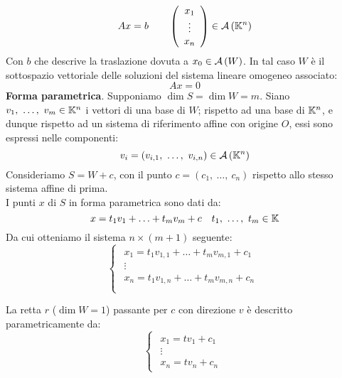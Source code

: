 	\begin{equation}
		Ax=b\qquad\left(\begin{array}{c}
			x_1\\
			\vdots\\
			x_n
		\end{array}\right)\in{\ensuremath{\mathcal{A}\left(\mathbb{K}^{n}\right)}}
	\end{equation}
Con $b$ che descrive la traslazione dovuta a $x_0\in{\ensuremath{\mathcal{A}\left(W\right)}}$.
In tal caso $W$ è il sottospazio vettoriale delle soluzioni del sistema lineare omogeneo associato:
\begin{equation}
	Ax=0
\end{equation}
\textbf{Forma parametrica}. Supponiamo $\dim S=\dim W=m$. Siano $v_1,\ \ldots,\ v_m\in\mathbb{K}^n$ i vettori di una base di $W$; rispetto ad una base di $\mathbb{K}^n$, e dunque rispetto ad un sistema di riferimento affine con origine $O$, essi sono espressi nelle componenti:
\begin{equation*}
	v_i=\left(v_{i,1},\ \ldots,\ v_{i,n}\right)\in\aff{\kamp^n}
\end{equation*}
Consideriamo $S=W+c$, con il punto $c=\left(c_1,\ \ldots,\ c_n\right)$ rispetto allo stesso sistema affine di prima.\\
I punti $x$ di $S$ in forma parametrica sono dati da:
\begin{equation}
	x=t_1v_1+\ldots+t_mv_m+c\quad t_1,\ \ldots,\ t_m\in\kamp
\end{equation}
Da cui otteniamo il sistema $n\times\left(m+1\right)$ seguente:
\begin{equation}
	\begin{cases}
		\begin{array}{l}
			x_1=t_1v_{1,1}+\ldots+t_mv_{m,1}+c_1\\
			\vdots\\
			x_n=t_1v_{1,n}+\ldots+t_mv_{m,n}+c_n\\			
		\end{array}
	\end{cases}
\end{equation}
\begin{example}
	La retta $r$ ($\dim W=1$) passante per $c$ con direzione $v$ è descritto parametricamente da:
\begin{equation*}
	\begin{cases}
		\begin{array}{l}
			x_1=tv_1+c_1\\
			\vdots\\
			x_n=tv_n+c_n			
		\end{array}
	\end{cases}
\end{equation*}	
\end{example}
